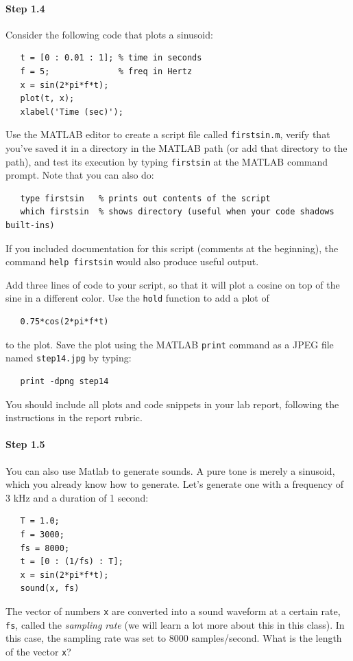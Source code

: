 \paragraph{Step 1.4} Consider the following code that plots a
sinusoid:
\begin{verbatim}
   t = [0 : 0.01 : 1]; % time in seconds
   f = 5;              % freq in Hertz
   x = sin(2*pi*f*t);
   plot(t, x);
   xlabel('Time (sec)');
\end{verbatim}
Use the MATLAB editor to create a script file called
\texttt{firstsin.m}, verify that you've saved it in a directory in the
MATLAB path (or add that directory to the path), and test its
execution by typing \texttt{firstsin} at the MATLAB command
prompt. Note that you can also do:
\begin{verbatim}
   type firstsin   % prints out contents of the script
   which firstsin  % shows directory (useful when your code shadows built-ins)
\end{verbatim}
If you included documentation for this script (comments at the
beginning), the command \verb|help firstsin| would also produce useful
output.

Add three lines of code to your script, so that it will plot a cosine
on top of the sine in a different color. Use the \texttt{hold}
function to add a plot of
\begin{verbatim}
   0.75*cos(2*pi*f*t)
\end{verbatim}
to the plot. Save the plot using the MATLAB \texttt{print} command as
a JPEG file named \texttt{step14.jpg} by typing:
\begin{verbatim}
   print -dpng step14
\end{verbatim}
You should include all plots and code snippets in your lab report,
following the instructions in the report rubric.


\paragraph{Step 1.5} You can also use Matlab to generate sounds. A
pure tone is merely a sinusoid, which you already know how to
generate. Let's generate one with a frequency of 3 kHz and a duration
of 1 second:
\begin{verbatim}
   T = 1.0;
   f = 3000;
   fs = 8000;
   t = [0 : (1/fs) : T];
   x = sin(2*pi*f*t);
   sound(x, fs)
\end{verbatim}
The vector of numbers \texttt{x} are converted into a sound waveform
at a certain rate, \verb|fs|, called the \emph{sampling rate} (we will
learn a lot more about this in this class). In this case, the sampling
rate was set to 8000 samples/second. What is the length of
the vector \texttt{x}?

